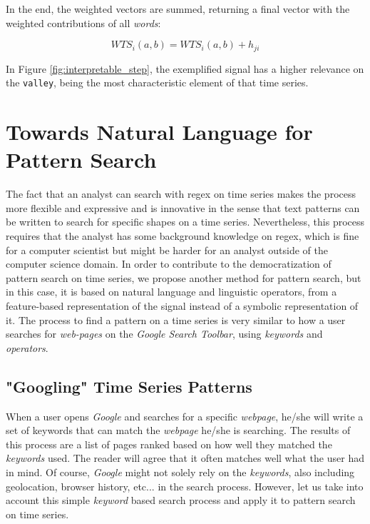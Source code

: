 In the end, the  weighted vectors are summed, returning a final vector with the weighted contributions of all \textit{words}:

\begin{equation}
WTS_i(a, b) = WTS_i(a, b) + h_{ji}
\end{equation}

In Figure \ref{fig:interpretable_step}, the exemplified signal has a higher relevance on the \texttt{valley}, being the most characteristic element of that time series.

\section{Towards Natural Language for Pattern Search}

The fact that an analyst can search with \gls{regex} on time series makes the process more flexible and expressive and is innovative in the sense that text patterns can be written to search for specific shapes on a time series. Nevertheless, this process requires that the analyst has some background knowledge on \gls{regex}, which is fine for a computer scientist but might be harder for an analyst outside of the computer science domain. In order to contribute to the democratization of pattern search on time series, we propose another method for pattern search, but in this case, it is based on natural language and linguistic operators, from a feature-based representation of the signal instead of a symbolic representation of it. The process to find a pattern on a time series is very similar to how a user searches for \textit{web-pages} on the \textit{Google Search Toolbar}, using \textit{keywords} and \textit{operators}.

\subsection{"Googling" Time Series Patterns}

When a user opens \textit{Google} and searches for a specific \textit{webpage}, he/she will write a set of keywords that can match the \textit{webpage} he/she is searching. The results of this process are a list of pages ranked based on how well they matched the \textit{keywords} used. The reader will agree that it often matches well what the user had in mind. Of course, \textit{Google} might not solely rely on the \textit{keywords}, also including geolocation, browser history, etc... in the search process. However, let us take into account this simple \textit{keyword} based search process and apply it to pattern search on time series.

